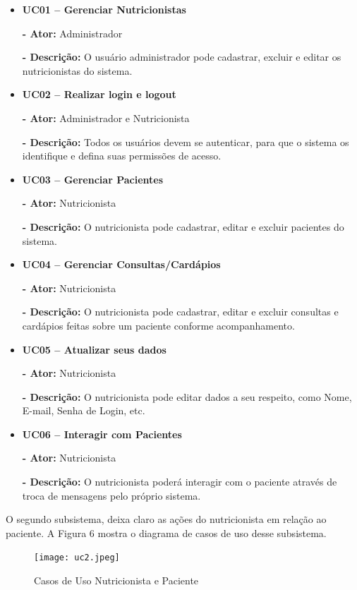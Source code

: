 \begin{itemize}
\item \textbf{UC01 – Gerenciar Nutricionistas}

\textbf{- Ator:} Administrador

\textbf{- Descrição:} O usuário administrador pode cadastrar, excluir e
editar os nutricionistas do sistema.

\item \textbf{UC02 – Realizar login e logout}

\textbf{- Ator:} Administrador e Nutricionista

\textbf{- Descrição:} Todos os usuários devem se autenticar, para que o
sistema os identifique e defina suas permissões de acesso.

\item \textbf{UC03 – Gerenciar Pacientes}

\textbf{- Ator:} Nutricionista

\textbf{- Descrição:} O nutricionista pode cadastrar, editar e excluir
pacientes do sistema.

\item \textbf{UC04 – Gerenciar Consultas/Cardápios}

\textbf{- Ator:} Nutricionista

\textbf{- Descrição:} O nutricionista pode cadastrar, editar e excluir
consultas e cardápios feitas sobre um paciente conforme acompanhamento.

\item \textbf{UC05 – Atualizar seus dados}

\textbf{- Ator:} Nutricionista

\textbf{- Descrição:} O nutricionista pode editar dados a seu respeito,
como Nome, E-mail, Senha de Login, etc.

\item \textbf{UC06 – Interagir com Pacientes}

\textbf{- Ator:} Nutricionista

\textbf{- Descrição:} O nutricionista poderá interagir com o paciente através de troca de mensagens pelo próprio sistema.

\end{itemize}

O segundo subsistema, deixa claro as ações do nutricionista em relação ao
paciente. A Figura 6 mostra o diagrama de casos de uso desse subsistema.

\begin{figure} [hbt] 
\begin{center}
\texttt{[image: uc2.jpeg]}
\end{center}
\label{uc2} 
\caption{Casos de Uso Nutricionista e Paciente}
\end{figure}

